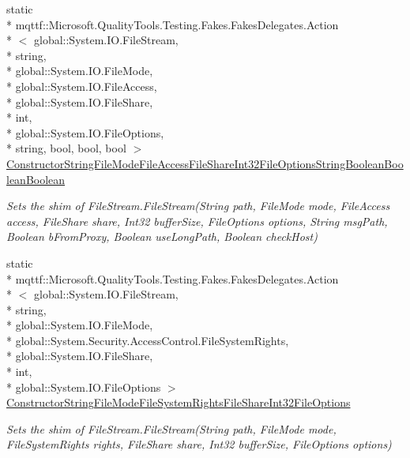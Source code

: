 \begin{DoxyCompactItemize}
static \\*
mqttf\-::\-Microsoft.\-Quality\-Tools.\-Testing.\-Fakes.\-Fakes\-Delegates.\-Action\\*
$<$ global\-::\-System.\-I\-O.\-File\-Stream, \\*
string, \\*
global\-::\-System.\-I\-O.\-File\-Mode, \\*
global\-::\-System.\-I\-O.\-File\-Access, \\*
global\-::\-System.\-I\-O.\-File\-Share, \\*
int, \\*
global\-::\-System.\-I\-O.\-File\-Options, \\*
string, bool, bool, bool $>$ \hyperlink{class_system_1_1_i_o_1_1_fakes_1_1_shim_file_stream_a6573bcfb60eb7c6c6882c1a2ec211803}{Constructor\-String\-File\-Mode\-File\-Access\-File\-Share\-Int32\-File\-Options\-String\-Boolean\-Boolean\-Boolean}
\begin{DoxyCompactList}\small\item\em Sets the shim of File\-Stream.\-File\-Stream(\-String path, File\-Mode mode, File\-Access access, File\-Share share, Int32 buffer\-Size, File\-Options options, String msg\-Path, Boolean b\-From\-Proxy, Boolean use\-Long\-Path, Boolean check\-Host)\end{DoxyCompactList}\item 
static \\*
mqttf\-::\-Microsoft.\-Quality\-Tools.\-Testing.\-Fakes.\-Fakes\-Delegates.\-Action\\*
$<$ global\-::\-System.\-I\-O.\-File\-Stream, \\*
string, \\*
global\-::\-System.\-I\-O.\-File\-Mode, \\*
global\-::\-System.\-Security.\-Access\-Control.\-File\-System\-Rights, \\*
global\-::\-System.\-I\-O.\-File\-Share, \\*
int, \\*
global\-::\-System.\-I\-O.\-File\-Options $>$ \hyperlink{class_system_1_1_i_o_1_1_fakes_1_1_shim_file_stream_ac2afc96cc84c293a12214d79329f4c53}{Constructor\-String\-File\-Mode\-File\-System\-Rights\-File\-Share\-Int32\-File\-Options}
\begin{DoxyCompactList}\small\item\em Sets the shim of File\-Stream.\-File\-Stream(\-String path, File\-Mode mode, File\-System\-Rights rights, File\-Share share, Int32 buffer\-Size, File\-Options options)\end{DoxyCompactList}\item 

\end{DoxyCompactItemize}
